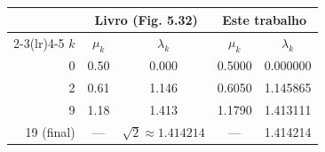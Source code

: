 \begin{tabular}{rcccc}
\toprule
 & \multicolumn{2}{c}{Livro (Fig. 5.32)} & \multicolumn{2}{c}{Este trabalho} \\
\cmidrule(lr){2-3}\cmidrule(lr){4-5}
$k$ & $\mu_k$ & $\lambda_k$ & $\mu_k$ & $\lambda_k$ \\
\midrule
0 & \num{0.50} & \num{0.000} & \num{0.5000} & \num{0.000000} \\
2 & \num{0.61} & \num{1.146} & \num{0.6050} & \num{1.145865} \\
9 & \num{1.18} & \num{1.413} & \num{1.1790} & \num{1.413111} \\
\midrule
19 (final) & --- & $\sqrt 2 \approx \num{1.414214}$ & --- & \num{1.414214} \\
\bottomrule
\end{tabular}
